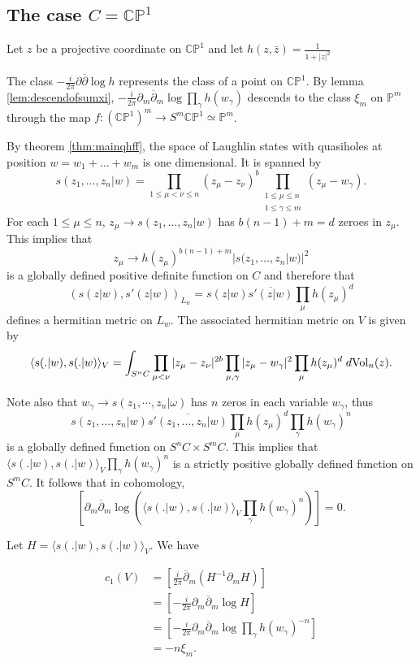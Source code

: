 \documentclass{article}
\theoremstyle{definition}
\newcommand{\pone}{\mathbb{C P}^1}
\newcommand{\ov}[1]{\overline{#1}}
\renewcommand{\leq}{\leqslant}
\begin{document}
\subsection{The case $C=\pone$}

Let $z$ be a projective coordinate on $\pone$ and let $h(z,\bar z)=\frac{1}{1+|z|^2}$

The class $-\frac{i}{2\pi}\partial \ov{\partial} \log h$ represents the class of a point on $\pone$. By lemma \ref{lem:descendofsumxi},  $-\frac{i}{2\pi}\partial_m \ov{\partial}_m \log \prod_{\gamma} h(w_\gamma)$ descends to the class $\xi_m$ on $\mathbb{P}^m$ through the map $f:(\pone)^{m}\to S^m \pone \simeq \mathbb{P}^m$.



By theorem \ref{thm:mainqhff}, the space of Laughlin states with quasiholes at position $w=w_1+\dots+w_m$ is one dimensional. It is spanned by $$s(z_1,\dots,z_n|w)=\prod_{1\leqslant\mu<\nu\leqslant n} (z_\mu - z_\nu)^b \prod_{\substack{1\leqslant\mu\leqslant n\\1\leqslant \gamma\leqslant m}}(z_\mu-w_\gamma).$$ 
For each $1\leq \mu \leq n$, $z_\mu \to s(z_1,\dots,z_n|w)$ has $b(n-1)+m=d$ zeroes in $z_\mu$. This implies that $$z_\mu\to h(z_\mu)^{b(n-1)+m} |s(z_1,\dots,z_n|w)|^2$$ is a globally defined positive definite function on $C$ and therefore that
$$(s(z|w),s'(z|w))_{L_w} = s(z|w)\ov{s'(z|w)} \prod_\mu h(z_\mu)^d$$ defines a hermitian metric on $L_w$.  The associated hermitian metric on $V$ is given by 
\begin{equation}
\label{eq:L2sphere}
\langle s(.|w),s(.|w) \rangle_V=\int_{S^n C}\prod_{\mu<\nu} |z_\mu - z_\nu |^{2b} \prod_{\mu,\gamma}  |z_\mu-w_\gamma|^2 \prod_\mu h(z_\mu)^d\; d{\rm Vol}_n(z).
\end{equation}

Note also that $w_\gamma\to s(z_1,\cdots,z_n|\omega)$ has $n$ zeros in each variable $w_\gamma$, thus $$s(z_1,\dots,z_n|w)\ov{s'(z_1,\dots,z_n|w)}\prod_\mu h(z_\mu)^d \prod_\gamma h(w_\gamma)^n$$ is a globally defined function on $S^n C \times S^m C$. This implies that $\langle s(.|w),s(.|w) \rangle_V \prod_{\gamma} h(w_\gamma)^{n}$ is a strictly positive globally defined function on $S^m C$. It follows that in cohomology, $$\left[\partial_m \ov{\partial}_m \log \left(\langle s(.|w),s(.|w)\rangle_V \prod_\gamma h(w_\gamma)^n\right)\right]=0.$$

Let $H=\langle s(.|w),s(.|w) \rangle_V $. We have 

\begin{align}\nonumber
    c_1(V)&= \left[\frac{i}{2\pi}\ov{\partial }_m (H^{-1} \partial_m H)\right]\\\nonumber
    &=\left[-\frac{i}{2\pi}\partial_m \ov{\partial}_m\log H\right]\\\nonumber
    &=\left[-\frac{i}{2\pi}\partial_m \ov{\partial}_m \log \prod_\gamma h(w_\gamma)^{-n}\right]\\
    &=-n\xi_m.
\end{align}
\end{document}
